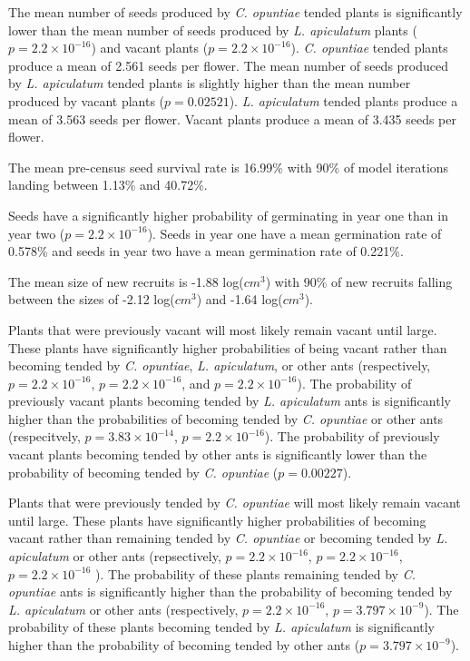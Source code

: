 \documentclass[11pt]{article}
\begin{document}
The mean number of seeds produced by \textit{C. opuntiae} tended plants is significantly lower than the mean number of seeds produced by \textit{L. apiculatum} plants ($p = 2.2 \times 10^{-16}$) and vacant plants ($p = 2.2 \times 10^{-16}$). 
\textit{C. opuntiae} tended plants produce a mean of 2.561 seeds per flower. 
The mean number of seeds produced by \textit{L. apiculatum} tended plants is slightly higher than the mean number produced by vacant plants ($p = 0.02521$). 
\textit{L. apiculatum} tended plants produce a mean of 3.563 seeds per flower. 
Vacant plants produce a mean of 3.435 seeds per flower. 

The mean pre-census seed survival rate is 16.99\% with 90\% of model iterations landing between 1.13\% and 40.72\%. 

Seeds have a significantly higher probability of germinating in year one than in year two ($p = 2.2 \times 10^{-16}$).
Seeds in year one have a mean germination rate of 0.578\% and seeds in year two have a mean germination rate of 0.221\%. 

The mean size of new recruits is -1.88 log($cm^3$) with 90\% of new recruits falling between the sizes of -2.12 log($cm^3$) and -1.64 log($cm^3$).

Plants that were previously vacant will most likely remain vacant until large. 
These plants have significantly higher probabilities of being vacant rather than becoming tended  by \textit{C. opuntiae}, \textit{L. apiculatum}, or other ants (respectively, $p = 2.2 \times 10^{-16}$, $p = 2.2 \times 10^{-16}$, and $p = 2.2 \times 10^{-16}$).
The probability of previously vacant plants becoming tended by \textit{L. apiculatum} ants is significantly higher than the probabilities of becoming tended by \textit{C. opuntiae} or other ants (respecitvely, $p = 3.83 \times 10^{-14}$, $p = 2.2 \times 10^{-16}$).
The probability of previously vacant plants becoming tended by other ants is significantly lower than the probability of becoming tended by \textit{C. opuntiae} ($p = 0.00227$).

Plants that were previously tended by \textit{C. opuntiae} will most likely remain vacant until large. 
These plants have significantly higher probabilities of becoming vacant rather than remaining tended by \textit{C. opuntiae} or becoming tended by \textit{L. apiculatum} or other ants (repsectively, $p = 2.2 \times 10^{-16}$, $p = 2.2 \times 10^{-16}$, $p = 2.2 \times 10^{-16}$ ).
The probability of these plants remaining tended by \textit{C. opuntiae} ants is significantly higher than the probability of becoming tended by \textit{L. apiculatum} or other ants (respectively, $p = 2.2 \times 10^{-16}$, $p = 3.797 \times 10^{-9}$).
The probability of these plants becoming tended by \textit{L. apiculatum} is significantly higher than the probability of becoming tended by other ants ($p = 3.797 \times 10^{-9}$).
\end{document}
